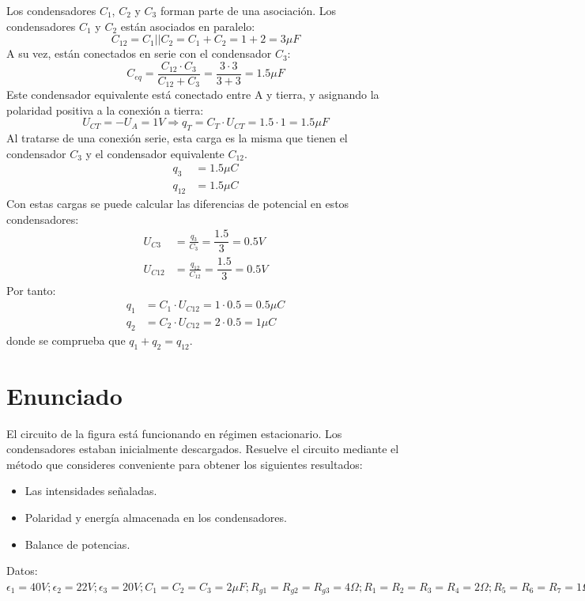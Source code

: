 Los condensadores $C_1$, $C_2$ y $C_3$ forman parte de una
asociación. Los condensadores $C_1$ y $C_2$ están asociados en
paralelo:
\begin{equation*}
  C_{12} = C_1 || C_2 = C_1 + C_2 = 1+2={3}{\mu F}
\end{equation*}
A su vez, están conectados en serie con el condensador $C_3$:
\begin{equation*}
  C_{eq} = \frac{C_{12} \cdot C_3}{C_{12} + C_3} =\dfrac{3\cdot 3}{3+3}= {1.5}{\mu F}
\end{equation*}
Este condensador equivalente está conectado entre A y tierra, y
asignando la polaridad positiva a la conexión a tierra:
\begin{equation*}
  U_{CT} = -U_A = {1}{V} \Rightarrow q_T = C_T \cdot U_{CT} =1.5\cdot 1= {1.5}{\mu F}
\end{equation*}
Al tratarse de una conexión serie, esta carga es la misma que tienen
el condensador $C_3$ y el condensador equivalente $C_{12}$.
\begin{align*}
  q_3 &=  {1.5}{\mu C}\\
  q_{12} &=  {1.5}{\mu C}
\end{align*}
Con estas cargas se puede calcular las diferencias de potencial en
estos condensadores:
\begin{align*}
  U_{C3} &=  \frac{q_3}{C_3} = \dfrac{1.5}{3}={0.5}{V}\\
  U_{C12} &=  \frac{q_{12}}{C_{12}}=\dfrac{1.5}{3} = {0.5}{V}
\end{align*}
Por tanto:
\begin{align*}
  q_1 &= C_1 \cdot U_{C12}=1\cdot 0.5 = {0.5}{\mu C}\\
  q_2 &= C_2 \cdot U_{C12}=2\cdot 0.5 = {1}{\mu C}
\end{align*}
donde se comprueba que $q_1 + q_2 = q_{12}$.

\section{Enunciado}
El circuito de la figura está funcionando en régimen estacionario. Los
condensadores estaban inicialmente descargados. Resuelve el circuito
mediante el método que consideres conveniente para obtener los
siguientes resultados:
\begin{itemize}
\item Las intensidades señaladas.
\item Polaridad y energía almacenada en los condensadores.
\item Balance de potencias.
\end{itemize}
Datos:
$\epsilon_{1}={40}V; \epsilon_{2}={22}V; \epsilon_{3}={20}V;
C_{1}=C_{2}=C_{3}={2}{\mu F}; R_{g1}=R_{g2}=R_{g3}={4}{\Omega};
R_{1}=R_{2}=R_{3}=R_{4}={2}{\Omega}; R_{5}=R_{6}=R_{7}={1}{\Omega}$

